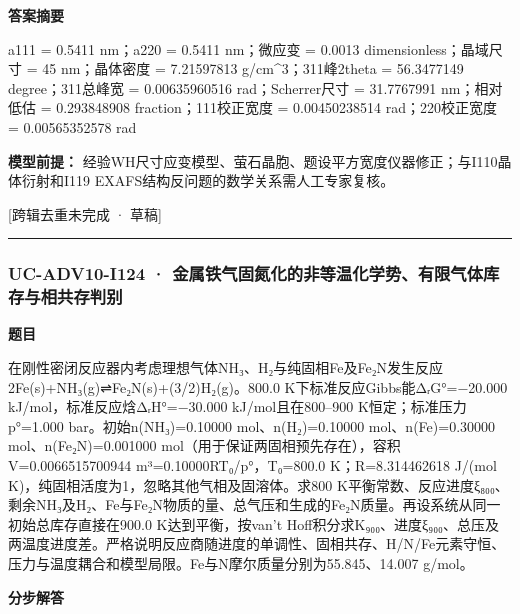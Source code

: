\documentclass[UTF8,11pt,a4paper]{ctexart}
\begin{document}
\noindent\textbf{答案摘要}\par
a111 = 0.5411 nm；a220 = 0.5411 nm；微应变 = 0.0013 dimensionless；晶域尺寸 = 45 nm；晶体密度 = 7.21597813 g/cm\textasciicircum{}3；311峰2theta = 56.3477149 degree；311总峰宽 = 0.00635960516 rad；Scherrer尺寸 = 31.7767991 nm；相对低估 = 0.293848908 fraction；111校正宽度 = 0.00450238514 rad；220校正宽度 = 0.00565352578 rad\par
\noindent\textbf{模型前提：}
经验WH尺寸应变模型、萤石晶胞、题设平方宽度仪器修正；与I110晶体衍射和I119 EXAFS结构反问题的数学关系需人工专家复核。\par
\noindent\textcolor{red!65!black}{[跨辑去重未完成 · 草稿]} \par
\medskip\hrule\medskip
{}
\subsubsection*{UC-ADV10-I124 · 金属铁气固氮化的非等温化学势、有限气体库存与相共存判别}
\noindent\textbf{题目}\par
在刚性密闭反应器内考虑理想气体NH₃、H₂与纯固相Fe及Fe₂N发生反应2Fe(s)+NH₃(g)⇌Fe₂N(s)+(3/2)H₂(g)。800.0 K下标准反应Gibbs能ΔᵣG°=−20.000 kJ/mol，标准反应焓ΔᵣH°=−30.000 kJ/mol且在800–900 K恒定；标准压力p°=1.000 bar。初始n(NH₃)=0.10000 mol、n(H₂)=0.10000 mol、n(Fe)=0.30000 mol、n(Fe₂N)=0.001000 mol（用于保证两固相预先存在），容积V=0.0066515700944 m³=0.10000RT₀/p°，T₀=800.0 K；R=8.314462618 J/(mol K)，纯固相活度为1，忽略其他气相及固溶体。求800 K平衡常数、反应进度ξ₈₀₀、剩余NH₃及H₂、Fe与Fe₂N物质的量、总气压和生成的Fe₂N质量。再设系统从同一初始总库存直接在900.0 K达到平衡，按van’t Hoff积分求K₉₀₀、进度ξ₉₀₀、总压及两温度进度差。严格说明反应商随进度的单调性、固相共存、H/N/Fe元素守恒、压力与温度耦合和模型局限。Fe与N摩尔质量分别为55.845、14.007 g/mol。\par
\medskip\noindent\textbf{分步解答}
\end{document}
